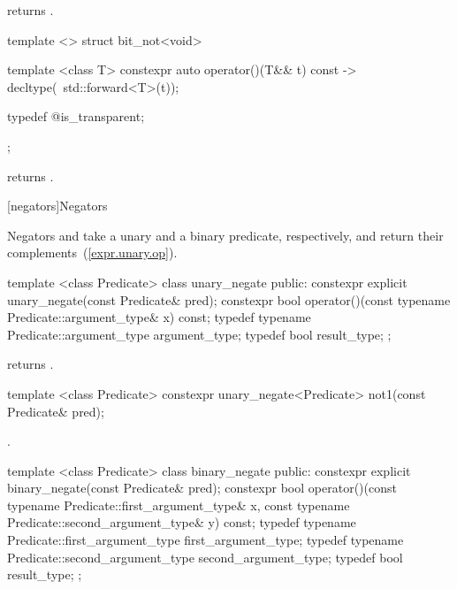 \begin{itemdescr}
\pnum
{} returns .
\end{itemdescr}

%
\begin{itemdecl}
template <> struct bit_not<void> {
  template <class T> constexpr auto operator()(T&& t) const
    -> decltype(~std::forward<T>(t));

  typedef @\unspec@ is_transparent;
};
\end{itemdecl}

\begin{itemdescr}
\pnum
{} returns .
\end{itemdescr}

[negators]{Negators}

\pnum
Negators  and  take a unary and a binary predicate,
respectively, and return their complements~(\ref{expr.unary.op}).

%
\begin{itemdecl}
template <class Predicate>
  class unary_negate {
public:
  constexpr explicit unary_negate(const Predicate& pred);
  constexpr bool operator()(const typename Predicate::argument_type& x) const;
  typedef typename Predicate::argument_type argument_type;
  typedef bool result_type;
};
\end{itemdecl}

\begin{itemdescr}
\pnum
{} returns .
\end{itemdescr}

%
\begin{itemdecl}
template <class Predicate>
  constexpr unary_negate<Predicate> not1(const Predicate& pred);
\end{itemdecl}

\begin{itemdescr}
\pnum
\returns
{}.
\end{itemdescr}

%
\begin{itemdecl}
template <class Predicate>
  class binary_negate {
  public:
    constexpr explicit binary_negate(const Predicate& pred);
    constexpr bool operator()(const typename Predicate::first_argument_type& x,
        const typename Predicate::second_argument_type& y) const;
  typedef typename Predicate::first_argument_type first_argument_type;
  typedef typename Predicate::second_argument_type second_argument_type;
  typedef bool result_type;
  };
\end{itemdecl}

